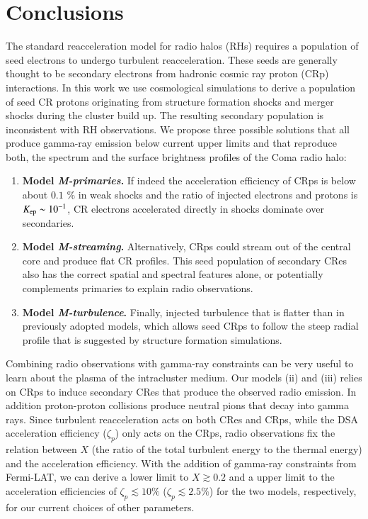 \documentclass[useAMS,usenatbib]{mn2e}
\begin{document}
\section{Conclusions}
\label{sec:conclusions}

The standard reacceleration model for radio halos (RHs) requires
a population of seed electrons to undergo turbulent
reacceleration. These seeds are generally thought to be secondary
electrons from hadronic cosmic ray proton (CRp) interactions. In
this work we use cosmological simulations to derive a population of
seed CR protons originating from structure formation shocks and merger
shocks during the cluster build up. The resulting secondary population
is inconsistent with RH observations. We propose three possible
solutions that all produce gamma-ray emission below current upper
limits and that reproduce both, the spectrum and the surface
brightness profiles of the Coma radio halo: 

\begin{enumerate}
\item {\bf Model {\em M-primaries}.} If indeed the acceleration
  efficiency of CRps is below about $0.1$ {\%} in weak shocks and the
  ratio of injected electrons and protons is $K_{{\mathrm{ep}}} \sim
  10^{-1}$, CR electrons accelerated directly in shocks dominate over
  secondaries.
\item {\bf Model {\em M-streaming}.} Alternatively, CRps could stream
  out of the central core and produce flat CR profiles. This seed
  population of secondary CRes also has the correct spatial and
  spectral features alone, or potentially complements primaries to
  explain radio observations.
\item {\bf Model {\em M-turbulence}.}  Finally, injected turbulence
  that is flatter than in previously adopted models, which allows seed
  CRps to follow the steep radial profile that is suggested by
  structure formation simulations.
\end{enumerate}

Combining radio observations with gamma-ray constraints can be very
useful to learn about the plasma of the intracluster medium. Our
models (ii) and (iii) relies on CRps to induce secondary CRes that
produce the observed radio emission. In addition proton-proton
collisions produce neutral pions that decay into gamma rays. Since
turbulent reacceleration acts on both CRes and CRps, while the DSA
acceleration efficiency ($\zeta_p$) only acts on the CRps, radio
observations fix the relation between $X$ (the ratio of the total
turbulent energy to the thermal energy) and the acceleration
efficiency. With the addition of gamma-ray constraints from Fermi-LAT,
we can derive a lower limit to $X\gtrsim0.2$ and a upper limit to the
acceleration efficiencies of $\zeta_p\lesssim 10\%$ ($\zeta_p\lesssim
2.5\%$) for the two models, respectively, for our current choices of
other parameters.
\end{document}
